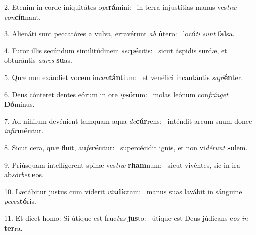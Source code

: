 2. Etenim in corde iniquitátes o\textit{pe}\textbf{rá}mini: \ast\  in terra injustítias manus ves\textit{træ} \textit{con}\textbf{cín}nant.\

3. Alienáti sunt peccatóres a vulva, erravérunt \textit{ab} \textbf{ú}tero: \ast\  locú\textit{ti} \textit{sunt} \textbf{fal}sa.\

4. Furor illis secúndum similitúdinem \textit{ser}\textbf{pén}tis: \ast\  sicut áspidis surdæ, et obturántis \textit{au}\textit{res} \textbf{su}as.\

5. Quæ non exáudiet vocem in\textit{can}\textbf{tán}tium: \ast\  et venéfici incantántis \textit{sa}\textit{pi}\textbf{én}ter.\

6. Deus cónteret dentes eórum in ore \textit{ip}\textbf{só}rum: \ast\  molas leónum con\textit{frín}\textit{get} \textbf{Dó}minus.\

7. Ad níhilum devénient tamquam aqua \textit{de}\textbf{cúr}rens: \ast\  inténdit arcum suum donec \textit{in}\textit{fir}\textbf{mén}tur.\

8. Sicut cera, quæ fluit, au\textit{fe}\textbf{rén}tur: \ast\  supercécidit ignis, et non vi\textit{dé}\textit{runt} \textbf{so}lem.\

9. Priúsquam intellígerent spinæ ves\textit{træ} \textbf{rham}num: \ast\  sicut vivéntes, sic in ira ab\textit{sór}\textit{bet} \textbf{e}os.\

10. Lætábitur justus cum víderit \textit{vin}\textbf{díc}tam: \ast\  manus suas lavábit in sánguine \textit{pec}\textit{ca}\textbf{tó}ris.\

11. Et dicet homo: Si útique est fruc\textit{tus} \textbf{jus}to: \ast\  útique est Deus júdicans e\textit{os} \textit{in} \textbf{ter}ra.\

